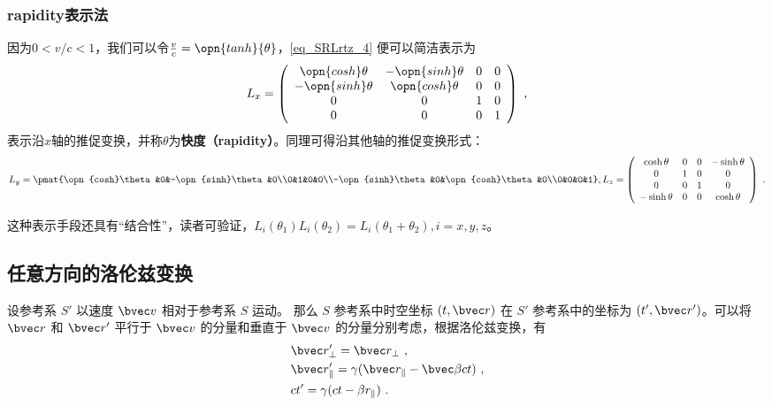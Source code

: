 \subsubsection{rapidity表示法}
因为$0<v/c<1$，我们可以令$\frac{v}{c}=\opn{tanh}{\theta}$，\autoref{eq_SRLrtz_4} 便可以简洁表示为
\begin{equation}
L_x=\left(\begin{array}{cccc}\opn{cosh}\theta & -\opn{sinh}\theta & 0 & 0 \\ -\opn{sinh}\theta & \opn{cosh}\theta & 0 & 0 \\ 0 & 0 & 1 & 0 \\ 0 & 0 & 0 & 1\end{array}\right)
~,\end{equation}
表示沿$x$轴的推促变换，并称$\theta$为\textbf{快度（rapidity）}。同理可得沿其他轴的推促变换形式：
\begin{equation}
L_y=\pmat{\opn{cosh}\theta&0&-\opn{sinh}\theta&0\\0&1&0&0\\-\opn{sinh}\theta&0&\opn{cosh}\theta&0\\0&0&0&1},L_z=\left(\begin{array}{cccc}
\cosh \theta & 0 & 0 & -\sinh \theta \\
0 & 1 & 0 & 0 \\
0 & 0 & 1 & 0 \\
-\sinh \theta & 0 & 0 & \cosh \theta
\end{array}\right)~.
\end{equation}

这种表示手段还具有“结合性”，读者可验证，$L_i(\theta_1)L_i(\theta_2)=L_i(\theta_1+\theta_2),i=x,y,z$。
\subsection{任意方向的洛伦兹变换}
设参考系 $S'$ 以速度 $\bvec v$ 相对于参考系 $S$ 运动。
那么 $S$ 参考系中时空坐标 $(t,\bvec r)$ 在 $S'$ 参考系中的坐标为 $(t',\bvec r')$。可以将 $\bvec r$ 和 $\bvec r'$ 平行于 $\bvec v$ 的分量和垂直于 $\bvec v$ 的分量分别考虑，根据洛伦兹变换，有
\begin{equation}
\begin{aligned}
&\bvec r'_{\perp}=\bvec r_{\perp}~,\\
&\bvec r'_{\parallel}=\gamma(\bvec r_{\parallel}-\bvec \beta ct)~,\\
&ct'=\gamma(ct-\beta r_{\parallel})~.
\end{aligned}
\end{equation}

